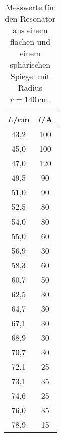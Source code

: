 \newpage
{}
\label{sec:Anhang}

\begin{table}[htp]
  \caption{Messwerte für den Resonator aus einem flachen und einem sphärischen Spiegel mit Radius $r=140$\,cm.}
  \label{tab:plankonkav}
	\begin{center}
		\begin{tabular}{cc}
		\toprule
			{$L$/cm} & {$I$/\mu A}\\
			\midrule
			43,2 & 100\\
			45,0 & 100\\
			47,0 & 120\\
			49,5 & 90\\
			51,0 & 90\\
			52,5 & 80\\
			54,0 & 80\\
			55,0 & 60\\
			56,9 & 30\\
			58,3 & 60\\
			60,7 & 50\\
			62,5 & 30\\
			64,7 & 30\\
			67,1 & 30\\
			68,9 & 30\\
			70,7 & 30\\
			72,1 & 25\\
			73,1 & 35\\
			74,6 & 25\\
			76,0 & 35\\
			78,9 & 15\\
		\bottomrule
		\end{tabular}
	\end{center}
\end{table}


